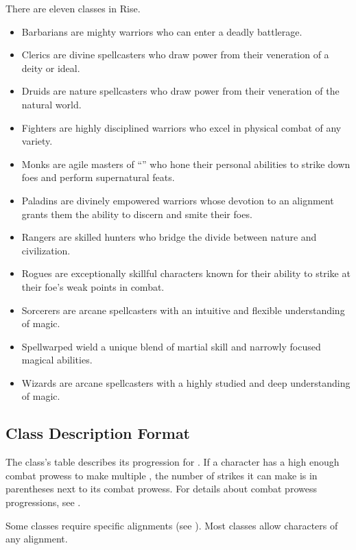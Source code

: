     There are eleven classes in Rise.
    \begin{itemize}
        \item Barbarians are mighty warriors who can enter a deadly battlerage.
        \item Clerics are divine spellcasters who draw power from their veneration of a deity or ideal.
        \item Druids are nature spellcasters who draw power from their veneration of the natural world.
        \item Fighters are highly disciplined warriors who excel in physical combat of any variety.
        \item Monks are agile masters of ``\ki'' who hone their personal abilities to strike down foes and perform supernatural feats.
        \item Paladins are divinely empowered warriors whose devotion to an alignment grants them the ability to discern and smite their foes.
        \item Rangers are skilled hunters who bridge the divide between nature and civilization.
        \item Rogues are exceptionally skillful characters known for their ability to strike at their foe's weak points in combat.
        \item Sorcerers are arcane spellcasters with an intuitive and flexible understanding of magic.
        \item Spellwarped wield a unique blend of martial skill and narrowly focused magical abilities.
        \item Wizards are arcane spellcasters with a highly studied and deep understanding of magic.
    \end{itemize}

    \subsection{Class Description Format}

        The class's table describes its progression for .
        If a character has a high enough combat prowess to make multiple , the number of strikes it can make is in parentheses next to its combat prowess.
        For details about combat prowess progressions, see .

        Some classes require specific alignments (see ).
        Most classes allow characters of any alignment.


